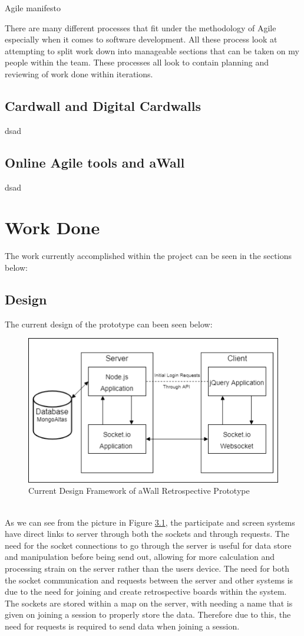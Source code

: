 \documentclass[11pt
              , a4paper
              , twoside
              , openright
              ]{report}
\begin{document}
Agile manifesto


There are many different processes that fit under the methodology of Agile especially when it comes to software development. All these process look at attempting to split work down into manageable sections that can be taken on my people within the team. These processes all look to contain planning and reviewing of work done within iterations. 
 
\section{Cardwall and Digital Cardwalls}
dsad
\section{Online Agile tools and aWall}
dsad

\chapter{Work Done}\label{C:workdone}
The work currently accomplished within the project can be seen in the sections below:
\section{Design}
The current design of the prototype can been seen below:
\begin{figure}[ht]
	\centering
	\includegraphics{arch_diagram}
	\caption{Current Design Framework of aWall Retrospective Prototype} \label{fig:archDiagram}
\end{figure}
\\
As we can see from the picture in Figure \ref{fig:archDiagram}, the participate and screen systems have direct links to server through both the sockets and through requests. The need for the socket connections to go through the server is useful for data store and manipulation before being send out, allowing for more calculation and processing strain on the server rather than the users device. 
The need for both the socket communication and requests between the server and other systems is due to the need for joining and create retrospective boards within the system. The sockets are stored within a map on the server, with needing a name that is given on joining a session to properly store the data. Therefore due to this, the need for requests is required to send data when joining a session.
\end{document}
